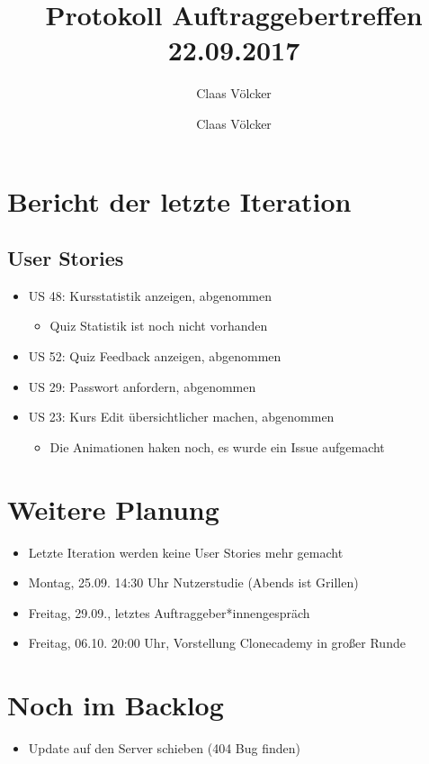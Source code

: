 \documentclass[colorback, accentcolor=tud1c, paper=a4]{tudexercise}
\title{Protokoll Auftraggebertreffen 22.09.2017}
\subtitle{Claas Völcker}
\author{Claas Völcker}
\begin{document}
\maketitle

\begin{multicols}{2}

\section*{Bericht der letzte Iteration}
\subsection*{User Stories}
\begin{itemize}
	\item US 48: Kursstatistik anzeigen, abgenommen
	\begin{itemize}
		\item Quiz Statistik ist noch nicht vorhanden
	\end{itemize}
	\item US 52: Quiz Feedback anzeigen, abgenommen
	\item US 29: Passwort anfordern, abgenommen
	\item US 23: Kurs Edit übersichtlicher machen, abgenommen
	\begin{itemize}
		\item Die Animationen haken noch, es wurde ein Issue aufgemacht
	\end{itemize}
\end{itemize}

\section*{Weitere Planung}
\begin{itemize}
	\item Letzte Iteration werden keine User Stories mehr gemacht
	\item Montag, 25.09. 14:30 Uhr Nutzerstudie (Abends ist Grillen)
	\item Freitag, 29.09., letztes Auftraggeber*innengespräch
	\item Freitag, 06.10. 20:00 Uhr, Vorstellung Clonecademy in großer Runde
\end{itemize}

\section*{Noch im Backlog}
\begin{itemize}
	\item Update auf den Server schieben (404 Bug finden)
\end{itemize}

\end{multicols}
\end{document}

